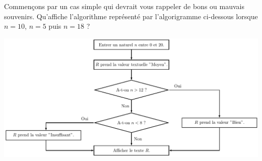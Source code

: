 Commençons par un cas simple qui devrait vous rappeler de bons ou mauvais souvenirs. Qu'affiche l'algorithme représenté par l'algorigramme ci-dessous lorsque $n=10$, $n=5$ puis $n=18$ ?
\begin{center}
    \includegraphics[width=1\textwidth]{reading/draw/text.pdf}
\end{center}

